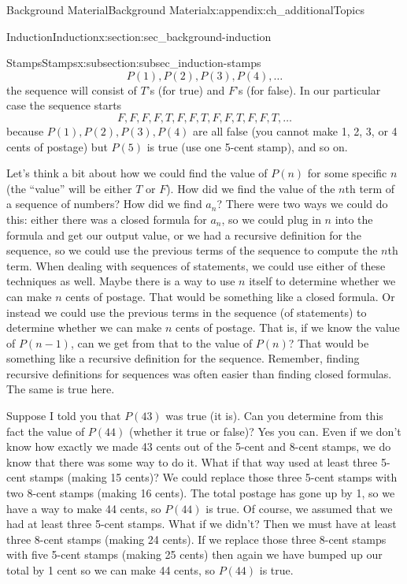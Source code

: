 \documentclass[oneside,10pt,]{book}
\numberwithin{equation}{chapter}
\begin{document}
\begin{appendixptx}{Background Material}{}{Background Material}{}{}{x:appendix:ch_additionalTopics}
\begin{sectionptx}{Induction}{}{Induction}{}{}{x:section:sec_background-induction}
\begin{subsectionptx}{Stamps}{}{Stamps}{}{}{x:subsection:subsec_induction-stamps}
\begin{equation*}
P(1), P(2), P(3), P(4), \ldots
\end{equation*}
the sequence will consist of \(T\)'s (for true) and \(F\)'s (for false). In our particular case the sequence starts%
\begin{equation*}
F,F,F,F,T,F,F,T,F,F,T,F,F,T,\ldots
\end{equation*}
because \(P(1), P(2), P(3), P(4)\) are all false (you cannot make 1, 2, 3, or 4 cents of postage) but \(P(5)\) is true (use one 5-cent stamp), and so on.%
\par
Let's think a bit about how we could find the value of \(P(n)\) for some specific \(n\) (the ``value'' will be either \(T\) or \(F\)). How did we find the value of the \(n\)th term of a sequence of numbers? How did we find \(a_n\)? There were two ways we could do this: either there was a closed formula for \(a_n\), so we could plug in \(n\) into the formula and get our output value, or we had a recursive definition for the sequence, so we could use the previous terms of the sequence to compute the \(n\)th term. When dealing with sequences of statements, we could use either of these techniques as well. Maybe there is a way to use \(n\) itself to determine whether we can make \(n\) cents of postage. That would be something like a closed formula. Or instead we could use the previous terms in the sequence (of statements) to determine whether we can make \(n\) cents of postage. That is, if we know the value of \(P(n-1)\), can we get from that to the value of \(P(n)\)? That would be something like a recursive definition for the sequence. Remember, finding recursive definitions for sequences was often easier than finding closed formulas. The same is true here.%
\par
Suppose I told you that \(P(43)\) was true (it is). Can you determine from this fact the value of \(P(44)\) (whether it true or false)? Yes you can. Even if we don't know how exactly we made 43 cents out of the 5-cent and 8-cent stamps, we do know that there was some way to do it. What if that way used at least three 5-cent stamps (making 15 cents)? We could replace those three 5-cent stamps with two 8-cent stamps (making 16 cents). The total postage has gone up by 1, so we have a way to make 44 cents, so \(P(44)\) is true. Of course, we assumed that we had at least three 5-cent stamps. What if we didn't? Then we must have at least three 8-cent stamps (making 24 cents). If we replace those three 8-cent stamps with five 5-cent stamps (making 25 cents) then again we have bumped up our total by 1 cent so we can make 44 cents, so \(P(44)\) is true.%

\end{subsectionptx}
\end{sectionptx}
\end{appendixptx}
\end{document}
